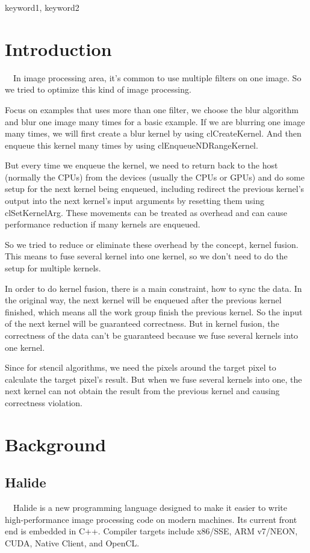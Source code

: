 \documentclass{sigplanconf}
\begin{document}
\keywords
keyword1, keyword2

\section{Introduction}
\quad\ \ In image processing area, it’s common to use multiple filters on one image. So we tried to optimize this kind of image processing.

    Focus on examples that uses more than one filter, we choose the blur algorithm and blur one image many times for a basic example. If we are blurring one image many times, we will first create a blur kernel by using clCreateKernel. And then enqueue this kernel many times by using clEnqueueNDRangeKernel.
    
    But every time we enqueue the kernel, we need to return back to the host (normally the CPUs) from the devices (usually the CPUs or GPUs) and do some setup for the next kernel being enqueued, including redirect the previous kernel’s output into the next  kernel’s input arguments by resetting them using clSetKernelArg. These movements can be treated as overhead and can cause performance reduction if many kernels are enqueued.
    
	So we tried to reduce or eliminate these overhead by the concept, kernel fusion. This means to fuse several kernel into one kernel, so we don’t need to do the setup for multiple kernels.
	
	In order to do kernel fusion, there is a main constraint, how to sync the data. In the original way, the next kernel will be enqueued after the previous kernel finished, which means all the work group finish the previous kernel. So the input of the next kernel will be guaranteed correctness. But in kernel fusion, the correctness of the data can’t be guaranteed because we fuse several kernels into one kernel.
	
	Since for stencil algorithms, we need the pixels around the target pixel to calculate the target pixel’s result. But when we fuse several kernels into one, the next kernel can not obtain the result from the previous kernel and causing correctness violation.

\section{Background}
\subsection{Halide}
\quad\ \ Halide\cite{halideori} is a new programming language designed to make it easier to write high-performance image processing code on modern machines. Its current front end is embedded in C++. Compiler targets include x86/SSE, ARM v7/NEON, CUDA, Native Client, and OpenCL.
\end{document}

